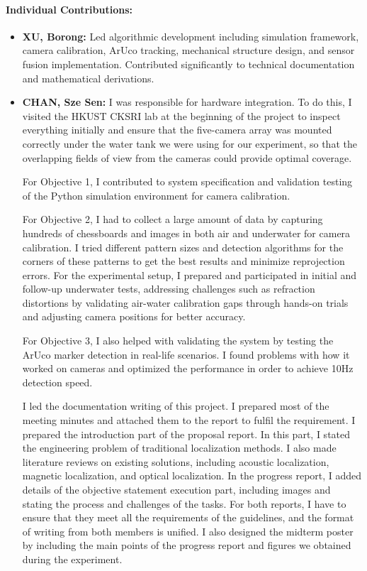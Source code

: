 \documentclass[11pt]{article}
\begin{document}
    \paragraph{Individual Contributions:}
    \begin{itemize}
        \item \textbf{XU, Borong:} Led algorithmic development including simulation framework, camera calibration, ArUco tracking, mechanical structure design, and sensor fusion implementation. Contributed significantly to technical documentation and mathematical derivations. 
        \newpage
        \item \textbf{CHAN, Sze Sen:} 
        I was responsible for hardware integration. To do this, I visited the HKUST CKSRI lab at the beginning of the project to inspect everything initially and ensure that the five-camera array was mounted correctly under the water tank we were using for our experiment, so that the overlapping fields of view from the cameras could provide optimal coverage. 

        For Objective 1, I contributed to system specification and validation testing of the Python simulation environment for camera calibration.
    
        For Objective 2, I had to collect a large amount of data by capturing hundreds of chessboards and images in both air and underwater for camera calibration. I tried different pattern sizes and detection algorithms for the corners of these patterns to get the best results and minimize reprojection errors. For the experimental setup, I prepared and participated in initial and follow-up underwater tests, addressing challenges such as refraction distortions by validating air-water calibration gaps through hands-on trials and adjusting camera positions for better accuracy.

        For Objective 3, I also helped with validating the system by testing the ArUco marker detection in real-life scenarios. I found problems with how it worked on cameras and optimized the performance in order to achieve 10Hz detection speed.
    
        I led the documentation writing of this project. I prepared most of the meeting minutes and attached them to the report to fulfil the requirement. I prepared the introduction part of the proposal report. In this part, I stated the engineering problem of traditional localization methods. I also made literature reviews on existing solutions, including acoustic localization, magnetic localization, and optical localization. In the progress report, I added details of the objective statement execution part, including images and stating the process and challenges of the tasks. For both reports, I have to ensure that they meet all the requirements of the guidelines, and the format of writing from both members is unified. I also designed the midterm poster by including the main points of the progress report and figures we obtained during the experiment.
    

\end{itemize}
\end{document}
